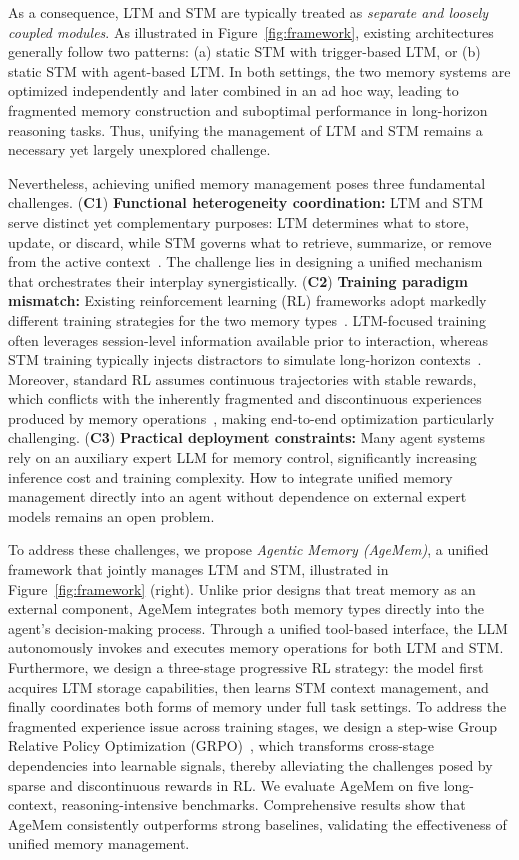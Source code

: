 As a consequence, LTM and STM are typically treated as \emph{separate and loosely coupled modules}. 
As illustrated in Figure~\ref{fig:framework}, existing architectures generally follow two patterns: 
(a) static STM with trigger-based LTM, or 
(b) static STM with agent-based LTM. 
In both settings, the two memory systems are optimized independently and later combined in an ad hoc way, leading to fragmented memory construction and suboptimal performance in long-horizon reasoning tasks.
Thus, unifying the management of LTM and STM remains a necessary yet largely unexplored challenge.

Nevertheless, achieving unified memory management poses three fundamental challenges. (\textbf{C1}) \textbf{Functional heterogeneity coordination:} LTM and STM serve distinct yet complementary purposes: LTM determines what to store, update, or discard, while STM governs what to retrieve, summarize, or remove from the active context~\citep{zhang2025survey}. The challenge lies in designing a unified mechanism that orchestrates their interplay synergistically. (\textbf{C2}) \textbf{Training paradigm mismatch:} Existing reinforcement learning (RL) frameworks adopt markedly different training strategies for the two memory types~\citep{ma2024coevolving}. LTM-focused training often leverages session-level information available prior to interaction, whereas STM training typically injects distractors to simulate long-horizon contexts~\citep{sun2024llm}. Moreover, standard RL assumes continuous trajectories with stable rewards, which conflicts with the inherently fragmented and discontinuous experiences produced by memory operations~\citep{wu2025resum}, making end-to-end optimization particularly challenging. (\textbf{C3}) \textbf{Practical deployment constraints:} Many agent systems rely on an auxiliary expert LLM for memory control, significantly increasing inference cost and training complexity. How to integrate unified memory management directly into an agent without dependence on external expert models remains an open problem.

To address these challenges, we propose \textit{Agentic Memory (AgeMem)}, a unified framework that jointly manages LTM and STM, illustrated in Figure~\ref{fig:framework} (right). 
Unlike prior designs that treat memory as an external component, AgeMem integrates both memory types directly into the agent’s decision-making process. Through a unified tool-based interface, the LLM autonomously invokes and executes memory operations for both LTM and STM. 
Furthermore, we design a three-stage progressive RL strategy: the model first acquires LTM storage capabilities, then learns STM context management, and finally coordinates both forms of memory under full task settings. 
To address the fragmented experience issue across training stages, we design a step-wise Group Relative Policy Optimization (GRPO)~\citep{shao2024deepseekmath}, which transforms cross-stage dependencies into learnable signals, thereby alleviating the challenges posed by sparse and discontinuous rewards in RL. We evaluate AgeMem on five long-context, reasoning-intensive benchmarks. Comprehensive results show that AgeMem consistently outperforms strong baselines, validating the effectiveness of unified memory management.

